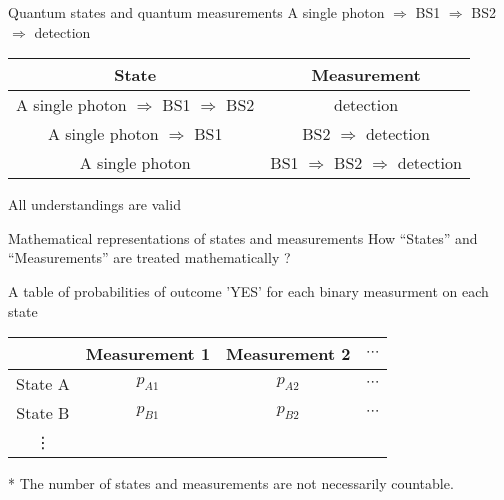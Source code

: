 \documentclass{beamer}
\begin{document}

\begin{frame}{Quantum states and quantum measurements}
\centering
A single photon $\Rightarrow$ BS1 $\Rightarrow$ BS2 $\Rightarrow$ detection

\vspace{2em}
\begin{tabular}{|c|c|}
\hline
State & Measurement \\
\hline
A single photon $\Rightarrow$ BS1 $\Rightarrow$ BS2 & detection\\
A single photon $\Rightarrow$ BS1 & BS2 $\Rightarrow$ detection\\
A single photon & BS1 $\Rightarrow$ BS2 $\Rightarrow$ detection\\
\hline
\end{tabular}

\vspace{5em}
\Large
All understandings are valid
\end{frame}

\begin{frame}{Mathematical representations of states and measurements}
How ``States'' and ``Measurements'' are treated mathematically ?

\vspace{2em}
\centering
A table of probabilities of outcome 'YES' for each binary measurment on each state

\vspace{1em}
\begin{tabular}{|c||c|c|c|}
\hline
& Measurement 1 & Measurement 2 & $\cdots$\\
\hline
\hline
State A& $p_{A1}$ & $p_{A2}$ & $\cdots$\\
State B& $p_{B1}$ & $p_{B2}$ & $\cdots$\\
\vdots& &&\\
\hline
\end{tabular}

\vspace{2em}
* The number of states and measurements are not necessarily countable.

%
\end{frame}
\end{document}
